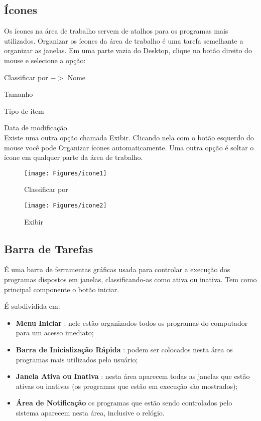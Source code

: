 \documentclass[hidelinks,12pt]{article}
\begin{document}
\subsection{Ícones}
	Os ícones na área de trabalho servem de atalhos para os programas mais utilizados.
	Organizar os ícones da área de trabalho é uma tarefa semelhante a organizar as janelas. Em uma parte vazia do Desktop, clique no botão direito do mouse e selecione a opção:

	Classificar por $->$ Nome

	 \hspace{3.6cm}Tamanho

	 \hspace{3.6cm}Tipo de item

	 \hspace{3.6cm}Data de modificação.\\

	 Existe uma outra opção chamada Exibir. Clicando nela com o botão esquerdo do mouse você pode Organizar ícones automaticamente. Uma outra opção é soltar o ícone em qualquer parte da área de trabalho.


	\begin{figure}[!htbp]
		\centering
		\begin{minipage}[b]{0.45\textwidth}
			\texttt{[image: Figures/icone1]}
			\caption{Classificar por}
			\label{fig:classificar por}
		\end{minipage}
		\hfill
		\begin{minipage}[b]{0.53\textwidth}
			\texttt{[image: Figures/icone2]}
			\caption{Exibir}
			\label{fig:exibir}
		\end{minipage}
	\end{figure}

\subsection{Barra de Tarefas}

	É uma barra de ferramentas gráficas usada para controlar a execução dos programas dispostos em janelas, classificando-as como ativa ou inativa. Tem como principal componente o botão iniciar.

	É subdividida em:

\begin{itemize}
	\item \textbf{Menu Iniciar} : nele estão organizados todos os programas do computador para um acesso imediato;

	\item \textbf{Barra de Inicialização Rápida} : podem ser colocados nesta área os programas mais utilizados pelo usuário;

	\item \textbf{Janela Ativa ou Inativa} : nesta área aparecem todas as janelas que estão ativas ou inativas (os programas que estão em execução são mostrados);

	\item \textbf{Área de Notificação} os programas que estão sendo controlados pelo sistema aparecem nesta área, inclusive o relógio.

\end{itemize}
\end{document}
